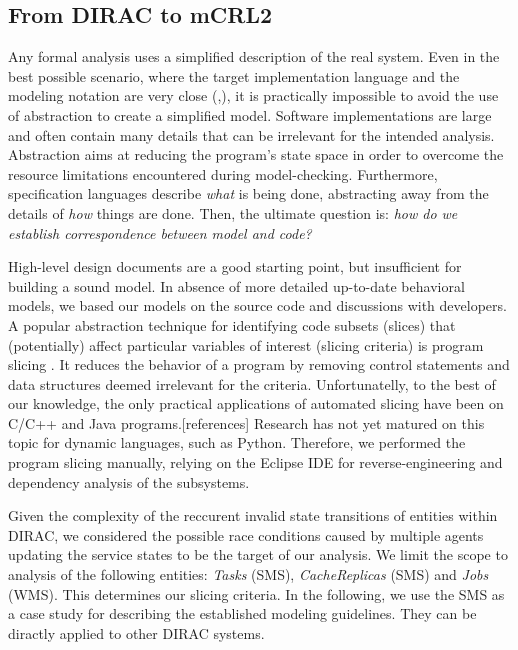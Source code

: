 \documentclass[10pt,conference]{IEEEtran}
\begin{document}
\subsection{From DIRAC to mCRL2}

Any formal analysis uses a simplified description of the real system. Even in the 
best possible scenario, where the target implementation language and the modeling 
notation are very close (\cite{Java_PathFinder},\cite{Musuvathi04modelchecking}), 
it is practically impossible to avoid the use of abstraction to create a simplified model. 
Software implementations are large and often contain many details that can be irrelevant 
for the intended analysis. Abstraction aims at reducing
the program's state space in order to overcome the resource limitations \cite{Pelánek08fightingstate} encountered during model-checking.
Furthermore, specification languages describe \textit{what} is being done, 
abstracting away from the details of \textit{how} things are done. 
Then, the ultimate question is: \textit{how do we establish correspondence between model and code?}

High-level design documents are a good starting point, but insufficient for 
building a sound model.
In absence of more detailed up-to-date behavioral models, 
we based our models on the source code and discussions with developers.
A popular abstraction technique
for identifying code subsets (slices) that (potentially) affect particular 
variables of interest (slicing criteria) is program slicing \cite{Hatcliff99slicingsoftware}. 
It reduces the behavior of a program
by removing control statements and data structures deemed irrelevant for 
the criteria. Unfortunatelly, to the best of our knowledge, the only practical
applications of automated slicing have been
on C/C++ and Java programs.[references] Research has not yet
matured on this topic for dynamic languages, such as Python. 
Therefore, we performed the program slicing manually, relying on the Eclipse IDE for 
reverse-engineering and dependency analysis of the subsystems.

Given the complexity of the reccurent invalid state transitions of entities within DIRAC, 
we considered the possible race conditions caused by multiple agents updating 
the service states to be the target of our analysis. We limit the scope
to analysis of the following entities: \textit{Tasks} (SMS), \textit{CacheReplicas} (SMS) and \textit{Jobs} (WMS).
This determines our slicing criteria. In the following, we use the SMS as a case study
for describing the established modeling guidelines. They can be 
diractly applied to other DIRAC systems.
\end{document}
